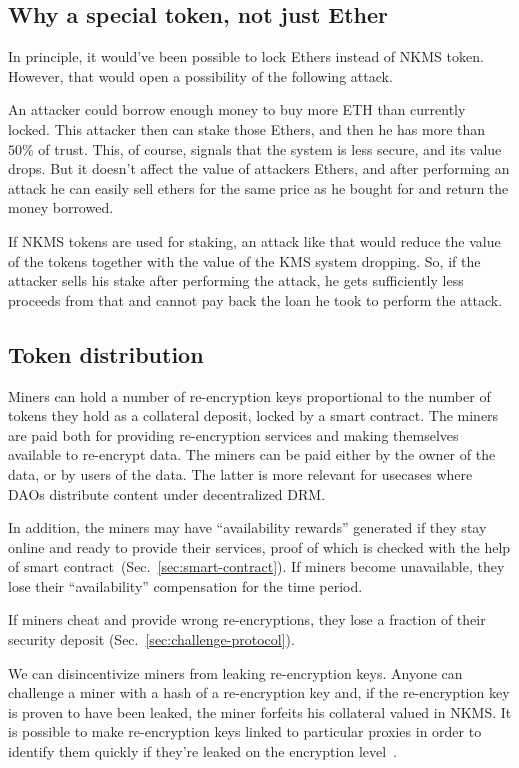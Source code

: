 \documentclass[longbibliography,nofootinbib]{revtex4-1}
\begin{document}
\subsection{Why a special token, not just Ether}

In principle, it would've been possible to lock Ethers instead of NKMS token.
However, that would open a possibility of the following attack.

An attacker could borrow enough money to buy more ETH than currently locked.
This attacker then can stake those Ethers, and then he has more than $50\%$ of trust.
This, of course, signals that the system is less secure, and its value drops.
But it doesn't affect the value of attackers Ethers, and after performing an attack he can easily sell ethers for the same price as he bought for and return
the money borrowed.

If NKMS tokens are used for staking, an attack like that would reduce the value of the tokens together with the value of the KMS system dropping.
So, if the attacker sells his stake after performing the attack, he gets sufficiently less proceeds from that and cannot pay back the loan he took to perform
the attack.

\subsection{Token distribution}

Miners can hold a number of re-encryption keys proportional to the number of tokens they hold as a collateral deposit, locked by a smart contract.
The miners are paid both for providing re-encryption services and making themselves available to re-encrypt data.
The miners can be paid either by the owner of the data, or by users of the data.
The latter is more relevant for usecases where DAOs distribute content under decentralized DRM.

In addition, the miners may have ``availability rewards'' generated if they stay online and ready to provide their services, proof of which is checked with the help of
smart contract~(Sec.~\ref{sec:smart-contract}).
If miners become unavailable, they lose their ``availability'' compensation for the time period.

If miners cheat and provide wrong re-encryptions, they lose a fraction of their security deposit (Sec.~\ref{sec:challenge-protocol}).

We can disincentivize miners from leaking re-encryption keys.
Anyone can challenge a miner with a hash of a re-encryption key and, if the re-encryption key is proven to have been leaked, the miner forfeits his collateral
valued in NKMS.
It is possible to make re-encryption keys linked to particular proxies in order to identify them quickly if they're leaked on the encryption
level~\cite{Libert2008}.
\end{document}
